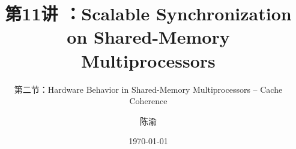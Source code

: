 


\title[第11讲]{第11讲 ：Scalable Synchronization on Shared-Memory Multiprocessors} %
\subtitle{第二节：Hardware Behavior in Shared-Memory Multiprocessors -- Cache Coherence}
\author{陈渝} %
\date{\today} %




\begin{frame}
\titlepage %
\end{frame}

